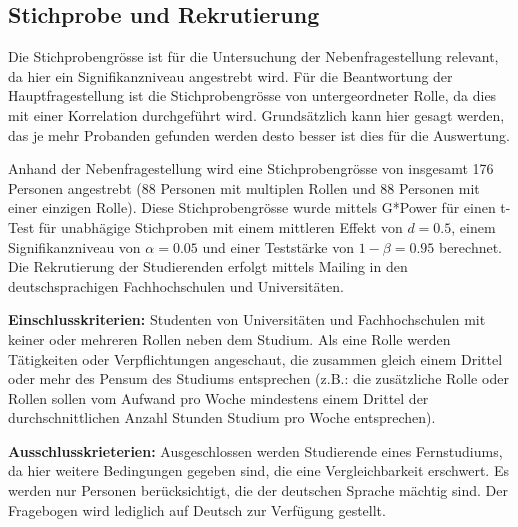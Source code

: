 \subsection*{Stichprobe und Rekrutierung}
Die Stichprobengrösse ist für die Untersuchung der Nebenfragestellung relevant, da hier ein Signifikanzniveau angestrebt wird. Für die Beantwortung der Hauptfragestellung ist die Stichprobengrösse von untergeordneter Rolle, da dies mit einer Korrelation durchgeführt wird. Grundsätzlich kann hier gesagt werden, das je mehr Probanden gefunden werden desto besser ist dies für die Auswertung.\par
Anhand der Nebenfragestellung wird eine Stichprobengrösse von insgesamt 176 Personen angestrebt (88 Personen mit multiplen Rollen und 88 Personen mit einer einzigen Rolle). Diese Stichprobengrösse wurde mittels G*Power für einen t-Test für unabhägige Stichproben mit einem mittleren Effekt von $d = 0.5$, einem Signifikanzniveau von $\alpha=0.05$ und einer Teststärke von $1-\beta=0.95$ berechnet.
Die Rekrutierung der Studierenden erfolgt mittels Mailing in den deutschsprachigen Fachhochschulen und Universitäten.\par
\textbf{Einschlusskriterien:}
Studenten von Universitäten und Fachhochschulen mit keiner oder mehreren Rollen neben dem Studium. Als eine Rolle werden Tätigkeiten oder Verpflichtungen angeschaut, die zusammen gleich einem Drittel oder mehr des Pensum des Studiums entsprechen (z.B.: die zusätzliche Rolle oder Rollen sollen vom Aufwand pro Woche mindestens einem Drittel der durchschnittlichen Anzahl Stunden Studium pro Woche entsprechen).\par
\textbf{Ausschlusskrieterien:}
Ausgeschlossen werden Studierende eines Fernstudiums, da hier weitere Bedingungen gegeben sind, die eine Vergleichbarkeit erschwert.
Es werden nur Personen berücksichtigt, die der deutschen Sprache mächtig sind. Der Fragebogen wird lediglich auf Deutsch zur Verfügung gestellt.
